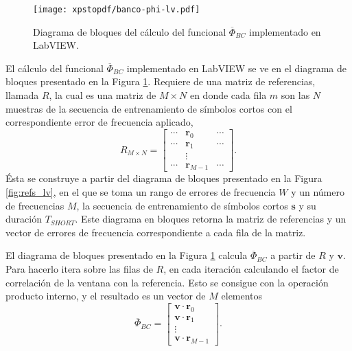 \begin{figure}[t]
    \centering{}\texttt{[image: xpstopdf/banco-phi-lv.pdf]}
    \caption[Diagrama de bloques del cálculo de $\overline{\Phi}_{BC}$ implementado en LabVIEW.]{Diagrama de bloques del cálculo del \color{RoyalBlue} funcional \color{black} $\overline{\Phi}_{BC}$ implementado en LabVIEW.\label{fig:bancox_lv}}  
\end{figure}

El cálculo del \color{RoyalBlue} funcional \color{black} $\overline{\Phi}_{BC}$ implementado en LabVIEW se ve en el diagrama de bloques presentado en la Figura \ref{fig:bancox_lv}. Requiere de una matriz de referencias, llamada $R$, la cual es una matriz de $M \times N$ en donde cada fila $m$ son las $N$ muestras de la secuencia de entrenamiento de símbolos cortos con el correspondiente error de frecuencia aplicado,
\begin{equation}
    R_{M\times N} = \begin{bmatrix}
       \cdots & \mathbf{r}_{0} & \cdots\\
       \cdots & \mathbf{r}_{1} & \cdots\\
       & \vdots & \\
       \cdots & \mathbf{r}_{M-1} & \cdots
    \end{bmatrix}.
\end{equation}
Ésta se construye a partir del diagrama de bloques presentado en la Figura \ref{fig:refs_lv}, en el que se toma un rango de errores de frecuencia $W$ y un número de frecuencias $M$, la secuencia de entrenamiento de símbolos cortos $\mathbf{s}$ y su duración $T_{SHORT}$. Este diagrama en bloques retorna la matriz de referencias y un vector de errores de frecuencia correspondiente a cada fila de la matriz.

El diagrama de bloques presentado en la Figura \ref{fig:bancox_lv} calcula $\overline{\Phi}_{BC}$ a partir de $R$ y $\mathbf{v}$. Para hacerlo itera sobre las filas de $R$, en cada iteración calculando el factor de correlación de la ventana con la referencia. Esto se consigue con la operación producto interno, y el resultado es un vector de $M$ elementos
\begin{equation}
    \overline{\Phi}_{BC} = \begin{bmatrix}
        \mathbf{v} \cdot \mathbf{r}_{0}\\
        \mathbf{v} \cdot \mathbf{r}_{1}\\
        \vdots\\
        \mathbf{v} \cdot \mathbf{r}_{M-1}
    \end{bmatrix}.
\end{equation}

